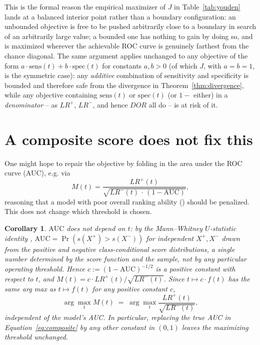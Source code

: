 \documentclass[11pt]{article}
\newtheorem{corollary}{Corollary}
\begin{document}
This is the formal reason the empirical maximizer of $J$ in
Table~\ref{tab:youden} lands at a balanced interior point rather than a
boundary configuration: an unbounded objective is free to be pushed
arbitrarily close to a boundary in search of an arbitrarily large value; a
bounded one has nothing to gain by doing so, and is maximized wherever the
achievable ROC curve is genuinely farthest from the chance diagonal. The
same argument applies unchanged to any objective of the form
$a\!\cdot\!\mathrm{sens}(t) + b\!\cdot\!\mathrm{spec}(t)$ for constants
$a, b > 0$ (of which $J$, with $a=b=1$, is the symmetric case): any
\emph{additive} combination of sensitivity and specificity is bounded and
therefore safe from the divergence in Theorem~\ref{thm:divergence}, while
any objective containing $\mathrm{sens}(t)$ or $\mathrm{spec}(t)$ (or
$1-$ either) in a \emph{denominator} -- as $LR^+$, $LR^-$, and hence $DOR$
all do -- is at risk of it.

\section{A composite score does not fix this}
\label{sec:composite}

One might hope to repair the objective by folding in the area under the ROC
curve (AUC), e.g. via
\begin{equation}
\label{eq:composite}
M(t) = \frac{LR^+(t)}{\sqrt{LR^-(t)\,\cdot\,(1 - \mathrm{AUC})}},
\end{equation}
reasoning that a model with poor overall ranking ability ()
should be penalized. This does not change which threshold is chosen.

\begin{corollary}
\label{cor:auc-invariance}
$\mathrm{AUC}$ does not depend on $t$: by the Mann--Whitney $U$-statistic
identity \citep{hanley1982}, $\mathrm{AUC} = \Pr(s(X^+) > s(X^-))$ for
independent $X^+, X^-$ drawn from the positive and negative
class-conditional score distributions, a single number determined by the
score function and the sample, not by any particular operating threshold.
Hence $c := (1 - \mathrm{AUC})^{-1/2}$ is a positive constant with respect
to $t$, and $M(t) = c \cdot LR^+(t)/\sqrt{LR^-(t)}$. Since
$t \mapsto c \cdot f(t)$ has the same arg max as $t \mapsto f(t)$ for any
positive constant $c$,
\begin{equation}
\arg\max_t M(t) \;=\; \arg\max_t \frac{LR^+(t)}{\sqrt{LR^-(t)}},
\end{equation}
independent of the model's AUC. In particular, replacing the true AUC in
Equation~\ref{eq:composite} by any other constant in $(0,1)$ leaves the
maximizing threshold unchanged.
\end{corollary}
\end{document}
